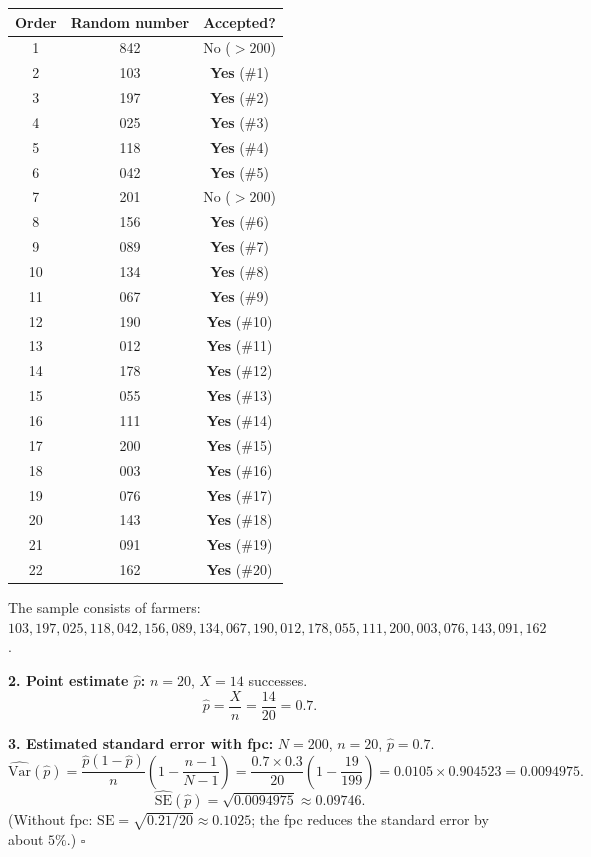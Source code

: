 \documentclass[11pt]{article}
\providecommand{\qed}{\hfill$\square$}
\begin{document}
\begin{exoresolu}
\begin{center}
\begin{tabular}{|c|c|c|}
\hline
Order & Random number & Accepted? \\
\hline
1 & 842 & No ($>200$) \\
2 & 103 & \textbf{Yes} (\#1) \\
3 & 197 & \textbf{Yes} (\#2) \\
4 & 025 & \textbf{Yes} (\#3) \\
5 & 118 & \textbf{Yes} (\#4) \\
6 & 042 & \textbf{Yes} (\#5) \\
7 & 201 & No ($>200$) \\
8 & 156 & \textbf{Yes} (\#6) \\
9 & 089 & \textbf{Yes} (\#7) \\
10 & 134 & \textbf{Yes} (\#8) \\
11 & 067 & \textbf{Yes} (\#9) \\
12 & 190 & \textbf{Yes} (\#10) \\
13 & 012 & \textbf{Yes} (\#11) \\
14 & 178 & \textbf{Yes} (\#12) \\
15 & 055 & \textbf{Yes} (\#13) \\
16 & 111 & \textbf{Yes} (\#14) \\
17 & 200 & \textbf{Yes} (\#15) \\
18 & 003 & \textbf{Yes} (\#16) \\
19 & 076 & \textbf{Yes} (\#17) \\
20 & 143 & \textbf{Yes} (\#18) \\
21 & 091 & \textbf{Yes} (\#19) \\
22 & 162 & \textbf{Yes} (\#20) \\
\hline
\end{tabular}
\end{center}
The sample consists of farmers: $103, 197, 025, 118, 042, 156, 089, 134, 067, 190, 012, 178, 055, 111, 200, 003, 076, 143, 091, 162$.

\textbf{2. Point estimate $\hat{p}$:}
$n=20$, $X=14$ successes.
\[
\hat{p} = \frac{X}{n} = \frac{14}{20} = 0.7.
\]

\textbf{3. Estimated standard error with fpc:}
$N=200$, $n=20$, $\hat{p}=0.7$.
\[
\widehat{\mathrm{Var}}(\hat{p}) = \frac{\hat{p}(1-\hat{p})}{n}\left(1-\frac{n-1}{N-1}\right)
= \frac{0.7\times0.3}{20}\left(1-\frac{19}{199}\right)
= 0.0105 \times 0.904523 = 0.0094975.
\]
\[
\widehat{\mathrm{SE}}(\hat{p}) = \sqrt{0.0094975} \approx 0.09746.
\]
(Without fpc: $\mathrm{SE} = \sqrt{0.21/20} \approx 0.1025$; the fpc reduces the standard error by about $5\%$.) \qed
\end{exoresolu}
\end{document}
